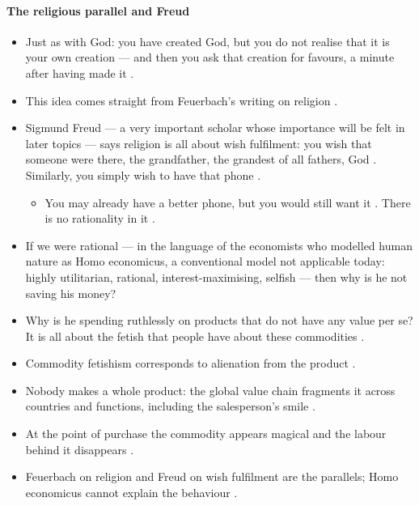 \paragraph{The religious parallel and Freud}
\begin{itemize}
    \item Just as with God: you have created God, but you do not realise that it is your own creation --- and then you ask that creation for favours, a minute after having made it .
    \item This idea comes straight from Feuerbach's writing on religion .
    \item Sigmund Freud --- a very important scholar whose importance will be felt in later topics --- says religion is all about wish fulfilment: you wish that someone were there, the grandfather, the grandest of all fathers, God . Similarly, you simply wish to have that phone .
    \begin{itemize}
        \item You may already have a better phone, but you would still want it . There is no rationality in it .
    \end{itemize}
\end{itemize}

\begin{CriticalPoint}
\begin{itemize}
    \item If we were rational --- in the language of the economists who modelled human nature as Homo economicus, a conventional model not applicable today: highly utilitarian, rational, interest-maximising, selfish --- then why is he not saving his money? 
    \item Why is he spending ruthlessly on products that do not have any value per se? It is all about the fetish that people have about these commodities .
\end{itemize}
\end{CriticalPoint}

\begin{QuickRevision}
\begin{itemize}
    \item Commodity fetishism corresponds to alienation from the product .
    \item Nobody makes a whole product: the global value chain fragments it across countries and functions, including the salesperson's smile .
    \item At the point of purchase the commodity appears magical and the labour behind it disappears .
    \item Feuerbach on religion and Freud on wish fulfilment are the parallels; Homo economicus cannot explain the behaviour .
\end{itemize}
\end{QuickRevision}

